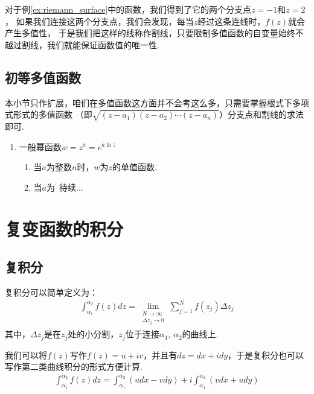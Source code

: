         对于例\ref{ex:riemann_surface}中的函数，我们得到了它的两个分支点$z = -1$和$z = 2$，
        如果我们连接这两个分支点，我们会发现，每当$z$经过这条连线时，$f(z)$就会产生多值性，
        于是我们把这样的线称作割线，只要限制多值函数的自变量始终不越过割线，我们就能保证函数值的唯一性.
        

    \subsection{初等多值函数}
        本小节只作扩展，咱们在多值函数这方面并不会考这么多，只需要掌握根式下多项式形式的多值函数
        （即$\sqrt{(z - a_1)(z - a_2)\cdots(z - a_n)}$）分支点和割线的求法即可.

        \begin{enumerate}
            \item 一般幂函数$w = z^a = e^{a \ln{z}}$
                \begin{enumerate}[(1)]
                    \item 当$a$为整数$n$时，$w$为$z$的单值函数.
                    \item 当$a$为\ 待续... %
                \end{enumerate}
        \end{enumerate}

\section{复变函数的积分}

    \subsection{复积分}
        \begin{definition}[复积分]\label{thm:complex_integral}
            复积分可以简单定义为：
            \begin{align*}
                \int_{\alpha_1}^{\alpha_2}f(z)dz 
                = \lim_{\substack{N \to \infty \\
                \varDelta z_j \to 0}}
                \sum_{j = 1}^{N}f(z_j)\varDelta z_j
            \end{align*}
            其中，$\varDelta z_j$是在$z_j$处的小分割，$z_j$位于连接$\alpha_1, \, \alpha_2$的曲线上.
        \end{definition}

        我们可以将$f(z)$写作$f(z) = u + iv$，并且有$dz = dx + idy$，于是复积分也可以写作第二类曲线积分的形式方便计算.
        \begin{align}
            \int_{\alpha_1}^{\alpha_2}f(z)dz = \int_{\alpha_1}^{\alpha_2}(udx - vdy) + i \int_{\alpha_1}^{\alpha_2}(vdx + udy)
        \end{align}

